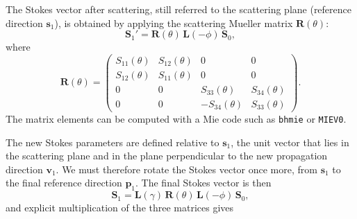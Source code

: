 \documentclass[english,a4paper]{my_memo}
\begin{document}
The Stokes vector after scattering, still referred to the
scattering plane (reference direction $\mathbf{s}_{1}$), is
obtained by applying the scattering Mueller matrix
$\mathbf{R}(\theta)$:
\[
\mathbf{S}_{1}'=\mathbf{R}(\theta)\,\mathbf{L}(-\phi)\,\mathbf{S}_{0},
\]
where
\[
\mathbf{R}(\theta)=\left(\begin{array}{cccc}
S_{11}(\theta) & S_{12}(\theta) & 0 & 0\\
S_{12}(\theta) & S_{11}(\theta) & 0 & 0\\
0 & 0 & S_{33}(\theta) & S_{34}(\theta)\\
0 & 0 & -S_{34}(\theta) & S_{33}(\theta)
\end{array}\right).
\]
The matrix elements can be computed with a Mie code such as
\texttt{bhmie} or \texttt{MIEV0}.

The new Stokes parameters are defined relative to $\mathbf{s}_{1}$,
the unit vector that lies in the scattering plane and in the plane
perpendicular to the new propagation direction $\boldsymbol{v}_{1}$.
We must therefore rotate the Stokes vector once more, from
$\mathbf{s}_{1}$ to the final reference direction
$\mathbf{p}_{1}$. The final Stokes vector is then
\[
\mathbf{S}_{1}=\mathbf{L}(\gamma)\,\mathbf{R}(\theta)\,\mathbf{L}(-\phi)\,\mathbf{S}_{0},
\]
and explicit multiplication of the three matrices gives
\end{document}
